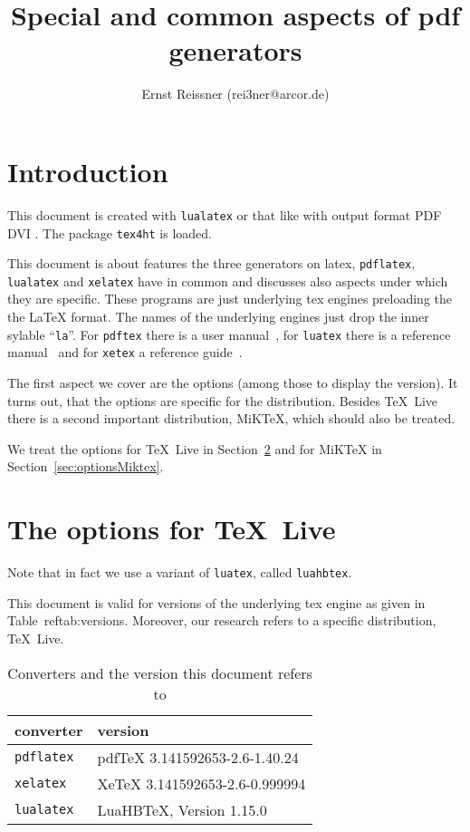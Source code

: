 \documentclass{article}
\title{Special and common aspects of pdf generators }
\author{Ernst Reissner (rei3ner@arcor.de)}
\date{}
\newcommand{\pdflatex}{\texttt{pdflatex}}
\newcommand{\lualatex}{\texttt{lualatex}}
\newcommand{\xelatex}{\texttt{xelatex}}
\newcommand{\texlive}{\TeX~Live}
\newcommand{\miktex}{MiKTeX}
\begin{document}
\maketitle
\tableofcontents
\listoftables

\section{Introduction}

This document is created with \lualatex{} or that like 
with output format 
\ifpdf%
PDF%
\else
DVI%
\fi.
The package \texttt{tex4ht} 
is  loaded. 

This document is about features the three generators on latex, 
\pdflatex, \lualatex{} and \xelatex{} have in common 
and discusses also aspects under which they are specific. 
These programs are just underlying tex engines preloading the the \LaTeX{} format. 
The names of the underlying engines just drop the inner sylable "`\texttt{la}"'. 
For \texttt{pdftex} there is a user manual~\cite{PdfTexUsr}, 
for \texttt{luatex} there is a reference manual~\cite{LuaTexRef} and 
for \texttt{xetex} a reference guide~\cite{XeTexRef}. 

The first aspect we cover are the options (among those to display the version). 
It turns out, that the options are specific for the distribution. 
Besides \texlive{} there is a second important distribution, \miktex, 
which should also be treated. 





We treat the options for \texlive{} in Section~\ref{sec:optionsTexlive} 
and for \miktex{} in Section~\ref{sec:optionsMiktex}. 

\section{The options for \texlive}\label{sec:optionsTexlive}


Note that in fact we use a variant of \texttt{luatex}, called \texttt{luahbtex}. 

This document is valid for versions of the underlying tex engine 
as given in Table~ref{tab:versions}. 
Moreover, our research refers to a specific distribution, \texlive. 


\begin{longtable}{|ll|}
  \toprule
  converter & version \\
  \midrule
  \midrule
  \endfirsthead%
  \bottomrule
  \caption{\label{tab:versions} Converters and the version this document refers to }
  \endlastfoot%
  \pdflatex{}  & pdfTeX 3.141592653-2.6-1.40.24 \\
  \xelatex{}   & XeTeX 3.141592653-2.6-0.999994 \\
  \lualatex{}  & LuaHBTeX, Version 1.15.0 \\
\end{longtable}
\end{document}

